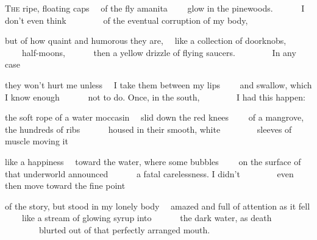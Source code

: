 \begin{poem}
\begin{stanza}
\textsc{The} ripe, floating caps\verseline
~~of the fly amanita\verseline
~~~~glow in the pinewoods.\verseline
~~~~~~I don't even think\verseline
~~~~~~~~of the eventual corruption of my body,
\end{stanza}

\begin{stanza}
but of how quaint and humorous they are,\verseline
~~like a collection of doorknobs,\verseline
~~~~half-moons,\verseline
~~~~~~then a yellow drizzle of flying saucers.\verseline
~~~~~~~~In any case
\end{stanza}

\begin{stanza}
they won't hurt me unless\verseline
~~I take them between my lips\verseline
~~~~and swallow, which I know enough\verseline
~~~~~~not to do. Once, in the south,\verseline
~~~~~~~~I had this happen:
\end{stanza}

\begin{stanza}
the soft rope of a water moccasin\verseline
~~slid down the red knees\verseline
~~~~of a mangrove, the hundreds of ribs\verseline
~~~~~~housed in their smooth, white\verseline
~~~~~~~~sleeves of muscle moving it
\end{stanza}

\begin{stanza}
like a happiness\verseline
~~toward the water, where some bubbles\verseline
~~~~on the surface of that underworld announced\verseline
~~~~~~a fatal carelessness. I didn't\verseline
~~~~~~~~even then move toward the fine point
\end{stanza}

\begin{stanza}
of the story, but stood in my lonely body\verseline
~~amazed and full of attention as it fell\verseline
~~~~like a stream of glowing syrup into\verseline
~~~~~~the dark water, as death\verseline
~~~~~~~~blurted out of that perfectly arranged mouth.
\end{stanza}
\end{poem}

\newpage %

